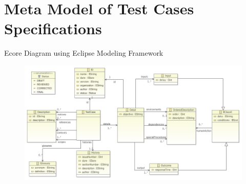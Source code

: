\documentclass{./template/openetcs_report}
\begin{document}
\chapter{Meta Model of Test Cases Specifications}
Ecore Diagram using Eclipse Modeling Framework 

\begin{figure}[!htbp]
\includegraphics[width=\textwidth]{images/TestMetaModel.png}
\end{figure}







\end{document}
